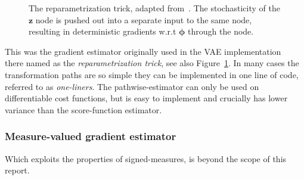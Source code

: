 \begin{figure}
	\centering
	\caption[The reparametrization trick]{The reparametrization trick, adapted from~\cite{kingma2017variational}. The stochasticity of the $\mathbf{z}$ node is pushed out into a separate input to the same node, resulting in deterministic gradients w.r.t $\boldsymbol{\phi}$ through the node.}
	\label{fig:reparam}
\end{figure}
This was the gradient estimator originally used in the VAE implementation~\cite{kingma2013auto} there named as the \emph{reparametrization trick}, see also Figure~\ref{fig:reparam}. In many cases the transformation paths are so simple they can be implemented in one line of code, referred to as \emph{one-liners}. The pathwise-estimator can only be used on differentiable cost functions, but is easy to implement and crucially has lower variance than the score-function estimator. 
	
\subsubsection{Measure-valued gradient estimator}
Which exploits the properties of signed-measures, is beyond the scope of this report.	
	
